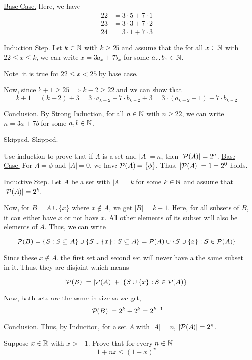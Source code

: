 \bs
\underline{Base Case.} Here, we have
\begin{align*}
	22 &= 3 \cdot 5 + 7 \cdot 1 \\
	23 &= 3 \cdot 3 + 7 \cdot 2 \\
	24 &= 3 \cdot 1 + 7 \cdot 3
\end{align*}

\underline{Induction Step.} Let $k \in \mathbb{N}$ with $k \geq 25$ and assume that the for all $x \in \mathbb{N}$ with $22 \leq x \leq k$, we can write $x = 3a_x + 7b_x$ for some $a_x, b_x \in \mathbb{N}$. 

Note: it is true for $22 \leq x < 25$ by base case.

Now, since $k+1 \geq 25 \implies k-2 \geq 22$ and we can show that
$$k+1 = (k-2) + 3 = 3 \cdot a_{k-2} + 7 \cdot b_{k-2} + 3 = 3 \cdot (a_{k-2}+1) + 7 \cdot b_{k-2}$$
\es

	\underline{Conclusion.} By Strong Induction, for all $n \in \mathbb{N}$ with $n \geq 22$, we can write $n = 3a + 7b$ for some $a, b \in \mathbb{N}$.


\bp Skipped. \ep
\bp Skipped. \ep

\bp Use induction to prove that if $A$ is a set and $|A| = n$, then $|\mathcal{P}(A)| = 2^n$. \ep
\bs
\underline{Base Case.} For $A = \phi$ and $|A| = 0$, we have $\mathcal{P}(A) = \{\phi\}$. Thus, $|\mathcal{P}(A)| = 1 = 2^0$ holds.

\underline{Inductive Step.} Let $A$ be a set with $|A| = k$ for some $k \in \mathbb{N}$ and assume that $|\mathcal{P}(A)| = 2^k$. 

Now, for $B = A \cup \{ x \}$ where $x \not\in A$, we get $|B| = k+1$. 
Here, for all subsets of $B$, it can either have $x$ or not have $x$. All other elements of its subset will also be elements of $A$. Thus, we can write

$$\mathcal{P}(B) = \{ S : S \subseteq A \} \cup \{ S \cup \{ x \} : S \subseteq A \} = \mathcal{P}(A) \cup \{ S \cup \{ x \} : S \in \mathcal{P}(A) \}$$

Since these $x \not\in A$, the first set and second set will never have a the same subset in it. Thus, they are disjoint which means

$$|\mathcal{P}(B)| = |\mathcal{P}(A)| + |\{S \cup \{x\} : S \in \mathcal{P}(A)\}|$$

Now, both sets are the same in size so we get, 
$$|\mathcal{P}(B)| = 2^k + 2^k = 2^{k+1}$$

\underline{Conclusion.} Thus, by Induciton, for a set $A$ with $|A|=n$, $|\mathcal{P}(A)| = 2^n$.
\es


\bp Suppose $x \in \mathbb{R}$ with $x > -1$. Prove that for every $n \in \mathbb{N}$
$$1+nx \leq (1+x)^n$$
\ep

